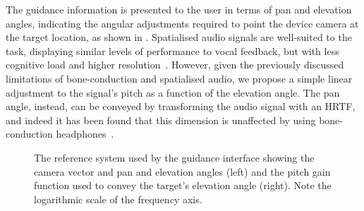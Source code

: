 \documentclass[]{interact}
\begin{document}
The guidance information is presented to the user in terms of pan and elevation angles, indicating the angular adjustments required to point the device camera at the target location, as shown in .
Spatialised audio signals are well-suited to the task, displaying similar levels of performance to vocal feedback, but with less cognitive load and higher resolution~\citep{klatzky2006cognitive}.
However, given the previously discussed limitations of bone-conduction and spatialised audio, we propose a simple linear adjustment to the signal's pitch as a function of the elevation angle. 
The pan angle, instead, can be conveyed by transforming the audio signal with an HRTF, and indeed it has been found that this dimension is unaffected by using bone-conduction headphones~\cite{schonstein2008comparison,macdonald2006spatial,stanley2006lateralization}. 

\begin{figure}[t]
  \centering
\hfil
  \caption{The reference system used by the guidance interface showing the camera vector and pan and elevation angles (left) and the pitch gain function used to convey the target's elevation angle (right). Note the logarithmic scale of the frequency axis.}
\end{figure}
\end{document}
